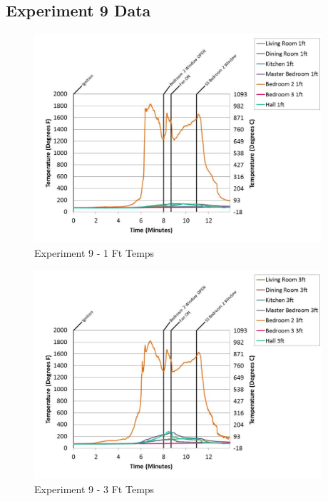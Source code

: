 \documentclass{article}
\begin{document}
\begin{appendices}
	\clearpage

		\clearpage
\clearpage		\large
\subsection{Experiment 9 Data} \label{App:Exp9Results} 

	\begin{figure}[h!]
		\centering
		\includegraphics[height=3.05in]{0_Images/Results_Charts/Exp_9_Charts/1FtTemps.pdf}
		\caption{Experiment 9 - 1 Ft Temps}
	\end{figure}
 

	\begin{figure}[h!]
		\centering
		\includegraphics[height=3.05in]{0_Images/Results_Charts/Exp_9_Charts/3FtTemps.pdf}
		\caption{Experiment 9 - 3 Ft Temps}
	\end{figure}
 
	\clearpage


\end{appendices}
\end{document}
